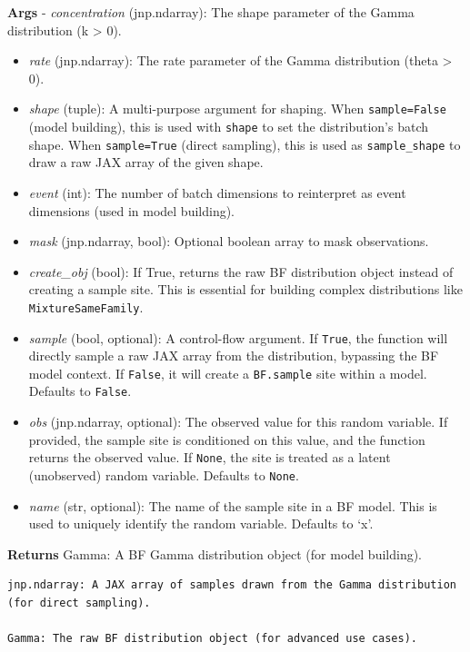 \documentclass[
  letterpaper,
  DIV=11,
  numbers=noendperiod]{scrartcl}
\begin{document}
\textbf{Args} - \emph{concentration} (jnp.ndarray): The shape parameter
of the Gamma distribution (k \textgreater{} 0).

\begin{itemize}
\item
  \emph{rate} (jnp.ndarray): The rate parameter of the Gamma
  distribution (theta \textgreater{} 0).
\item
  \emph{shape} (tuple): A multi-purpose argument for shaping. When
  \texttt{sample=False} (model building), this is used with
  \texttt{shape} to set the distribution's batch shape. When
  \texttt{sample=True} (direct sampling), this is used as
  \texttt{sample\_shape} to draw a raw JAX array of the given shape.
\item
  \emph{event} (int): The number of batch dimensions to reinterpret as
  event dimensions (used in model building).
\item
  \emph{mask} (jnp.ndarray, bool): Optional boolean array to mask
  observations.
\item
  \emph{create\_obj} (bool): If True, returns the raw BF distribution
  object instead of creating a sample site. This is essential for
  building complex distributions like \texttt{MixtureSameFamily}.
\item
  \emph{sample} (bool, optional): A control-flow argument. If
  \texttt{True}, the function will directly sample a raw JAX array from
  the distribution, bypassing the BF model context. If \texttt{False},
  it will create a \texttt{BF.sample} site within a model. Defaults to
  \texttt{False}.
\item
  \emph{obs} (jnp.ndarray, optional): The observed value for this random
  variable. If provided, the sample site is conditioned on this value,
  and the function returns the observed value. If \texttt{None}, the
  site is treated as a latent (unobserved) random variable. Defaults to
  \texttt{None}.
\item
  \emph{name} (str, optional): The name of the sample site in a BF
  model. This is used to uniquely identify the random variable. Defaults
  to `x'.
\end{itemize}

\textbf{Returns} Gamma: A BF Gamma distribution object (for model
building).

\begin{verbatim}
jnp.ndarray: A JAX array of samples drawn from the Gamma distribution (for direct sampling).

Gamma: The raw BF distribution object (for advanced use cases).
\end{verbatim}
\end{document}
